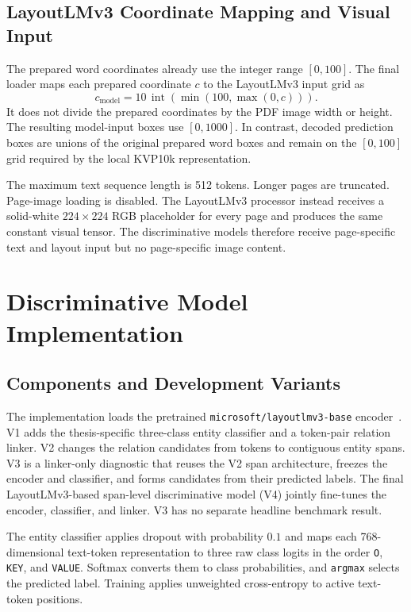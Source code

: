 \subsection{LayoutLMv3 Coordinate Mapping and Visual Input}
\label{sec:image-processing}

The prepared word coordinates already use the integer range $[0,100]$. The
final loader maps each prepared coordinate $c$ to the LayoutLMv3 input grid as
\[
  c_{\mathrm{model}}
  =10\,\operatorname{int}\!\left(\min(100,\max(0,c))\right).
\]
It does not divide the prepared coordinates by the PDF image width or height.
The resulting model-input boxes use $[0,1000]$. In contrast, decoded prediction
boxes are unions of the original prepared word boxes and remain on the
$[0,100]$ grid required by the local KVP10k representation.

The maximum text sequence length is 512 tokens. Longer pages are truncated.
Page-image loading is disabled. The LayoutLMv3 processor instead receives a
solid-white $224\times224$ RGB placeholder for every page and produces the
same constant visual tensor. The discriminative models therefore receive
page-specific text and layout input but no page-specific image content.

\section{Discriminative Model Implementation}
\label{sec:model-implementation}

\subsection{Components and Development Variants}
\label{sec:layoutlmv3-integration}

The implementation loads the pretrained
\texttt{microsoft/layoutlmv3-base} encoder~\cite{layoutlmv3}. V1 adds the
thesis-specific three-class entity classifier and a token-pair relation linker.
V2 changes the relation candidates from tokens to contiguous entity spans. V3
is a linker-only diagnostic that reuses the V2 span architecture, freezes the
encoder and classifier, and forms candidates from their predicted labels. The
final LayoutLMv3-based span-level discriminative model (V4) jointly fine-tunes
the encoder, classifier, and linker. V3 has no separate headline benchmark
result.

The entity classifier applies dropout with probability $0.1$ and maps each
768-dimensional text-token representation to three raw class logits in the
order \texttt{O}, \texttt{KEY}, and \texttt{VALUE}. Softmax converts them to
class probabilities, and \texttt{argmax} selects the predicted label. Training
applies unweighted cross-entropy to active text-token positions.

